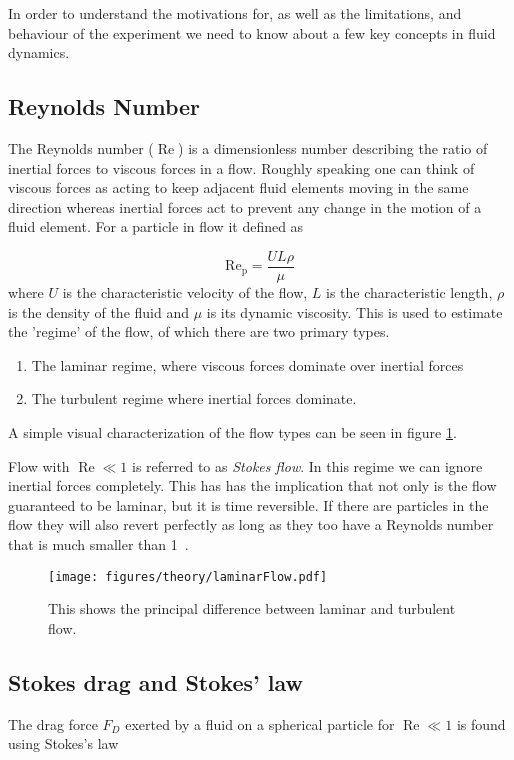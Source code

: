 In order to understand the motivations for, as well as the limitations, and behaviour of the experiment we need to know about a few key concepts in fluid dynamics.

\subsection{Reynolds Number}
The Reynolds number ($\operatorname{Re}$) is a dimensionless number describing the ratio of inertial forces to viscous forces in a flow. Roughly speaking one can think of viscous forces as acting to keep adjacent fluid elements moving in the same direction whereas inertial forces act to prevent any change in the motion of a fluid element. For a particle in flow it defined as \cite{introfluid}

\begin{equation}\label{eq:reynolds}
\operatorname{Re_p} = \frac{U L \rho}{\mu}
\end{equation}
where $U$ is the characteristic velocity of the flow, $L$ is the characteristic length, $\rho$ is the density of the fluid and $\mu$ is its dynamic viscosity. This is used to estimate the 'regime' of the flow, of which there are two primary types. 
\begin{enumerate}
\item The laminar regime, where viscous forces dominate over inertial forces
\item The turbulent regime where inertial forces dominate.
\end{enumerate}

A simple visual characterization of the flow types can be seen in figure \ref{fig:laminar_flow}. 

 Flow with $\operatorname{Re}\ll 1$ is referred to as \emph{Stokes flow}. In this regime we can ignore inertial forces completely. This has has the implication that not only is the flow guaranteed to be laminar, but it is time reversible.  If there are particles in the flow they will also revert perfectly as long as they too have a Reynolds number that is much smaller than 1~\cite{introfluid3}. 

\begin{figure}[H]
\centering
\texttt{[image: figures/theory/laminarFlow.pdf]}
\caption{This shows the principal difference between laminar and turbulent flow.}
\label{fig:laminar_flow}
\end{figure}


\subsection{Stokes drag and Stokes' law}
The drag force $F_D$ exerted by a fluid on a spherical particle for $\operatorname{Re} \ll 1$ is found using  Stokes's law \cite{introfluid2}

